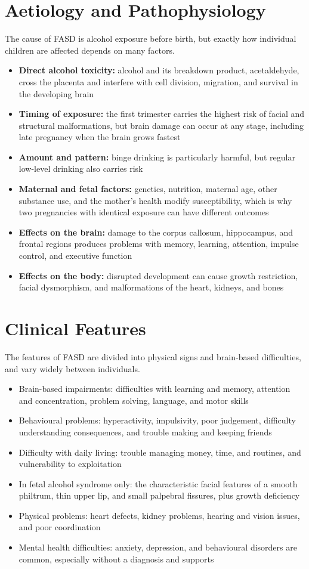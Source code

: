 \section*{Aetiology and Pathophysiology}
The cause of FASD is alcohol exposure before birth, but exactly how individual children are affected depends on many factors.
\begin{itemize}
    \item \textbf{Direct alcohol toxicity:} alcohol and its breakdown product, acetaldehyde, cross the placenta and interfere with cell division, migration, and survival in the developing brain
    \item \textbf{Timing of exposure:} the first trimester carries the highest risk of facial and structural malformations, but brain damage can occur at any stage, including late pregnancy when the brain grows fastest
    \item \textbf{Amount and pattern:} binge drinking is particularly harmful, but regular low-level drinking also carries risk
    \item \textbf{Maternal and fetal factors:} genetics, nutrition, maternal age, other substance use, and the mother's health modify susceptibility, which is why two pregnancies with identical exposure can have different outcomes
    \item \textbf{Effects on the brain:} damage to the corpus callosum, hippocampus, and frontal regions produces problems with memory, learning, attention, impulse control, and executive function
    \item \textbf{Effects on the body:} disrupted development can cause growth restriction, facial dysmorphism, and malformations of the heart, kidneys, and bones
\end{itemize}

\section*{Clinical Features}
The features of FASD are divided into physical signs and brain-based difficulties, and vary widely between individuals.
\begin{itemize}
    \item Brain-based impairments: difficulties with learning and memory, attention and concentration, problem solving, language, and motor skills
    \item Behavioural problems: hyperactivity, impulsivity, poor judgement, difficulty understanding consequences, and trouble making and keeping friends
    \item Difficulty with daily living: trouble managing money, time, and routines, and vulnerability to exploitation
    \item In fetal alcohol syndrome only: the characteristic facial features of a smooth philtrum, thin upper lip, and small palpebral fissures, plus growth deficiency
    \item Physical problems: heart defects, kidney problems, hearing and vision issues, and poor coordination
    \item Mental health difficulties: anxiety, depression, and behavioural disorders are common, especially without a diagnosis and supports
\end{itemize}

